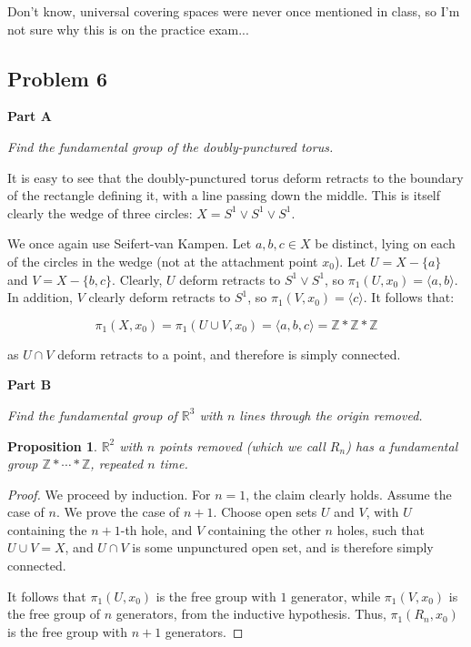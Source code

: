 \documentclass[10pt, oneside]{amsart}
\newtheorem{prop}{Proposition}
\begin{document}
    Don't know, universal covering spaces were never once mentioned in class, so I'm not sure why this is on the practice exam...

    \hrulefill

    \subsection{Problem 6}

    \textbf{Part A}
    \newline

    \textit{Find the fundamental group of the doubly-punctured torus.}
    \newline

    It is easy to see that the doubly-punctured torus deform retracts to the boundary of the rectangle defining it, with a line passing down the middle. This is itself clearly the wedge of three circles: $X = S^{1} \vee S^{1} \vee S^{1}$.
    \newline

    We once again use Seifert-van Kampen. Let $a, b, c \in X$ be distinct, lying on each of the circles in the wedge (not at the attachment point $x_0$). Let $U = X - \{a\}$ and $V = X - \{b, c\}$. Clearly, $U$ deform retracts to $S^{1} \vee S^{1}$,
    so $\pi_1(U, x_0) = \langle a, b \rangle$. In addition, $V$ clearly deform retracts to $S^{1}$, so $\pi_1(V, x_0) = \langle c \rangle$. It follows that:

    $$\pi_1(X, x_0) = \pi_1(U \cup V, x_0) = \langle a, b, c \rangle = \mathbb{Z} * \mathbb{Z} * \mathbb{Z}$$

    as $U \cap V$ deform retracts to a point, and therefore is simply connected.
    \newline
    
    \textbf{Part B}
    \newline

    \textit{Find the fundamental group of $\mathbb{R}^3$ with $n$ lines through the origin removed.}
    \newline

    \begin{prop}
      $\mathbb{R}^2$ with $n$ points removed (which we call $R_n$) has a fundamental group $\mathbb{Z} * \cdots * \mathbb{Z}$, repeated $n$ time.
    \end{prop}

    \begin{proof}
      We proceed by induction. For $n = 1$, the claim clearly holds. Assume the case of $n$. We prove the case of $n + 1$. Choose open sets $U$ and $V$, with $U$ containing the $n + 1$-th hole, and
      $V$ containing the other $n$ holes, such that $U \cup V = X$, and $U \cap V$ is some unpunctured open set, and is therefore simply connected.
      \newline

      It follows that $\pi_1(U, x_0)$ is the free group with $1$ generator, while $\pi_1(V, x_0)$ is the free group of $n$ generators, from the inductive hypothesis. Thus, $\pi_1(R_n, x_0)$ is the
      free group with $n + 1$ generators.
      \end{proof}
\end{document}
